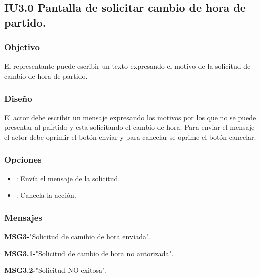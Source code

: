 \subsection{IU3.0 Pantalla de solicitar cambio de hora de partido.}

\subsubsection{Objetivo}
	El representante puede escribir un texto expresando el motivo de la solicitud de cambio de hora de partido.

\subsubsection{Diseño}
  El actor debe escribir un mensaje expresando los motivos por los que no se puede presentar al pafrtido y esta solicitando el cambio de hora.
  Para enviar el mensaje el actor debe oprimir el botón enviar y para cancelar se oprime el botón cancelar.


\subsubsection{Opciones}
\begin{itemize}
	\item {}: Envía el mensaje de la solicitud.
  \item {}: Cancela la acción.
\end{itemize}

\subsubsection{Mensajes}
	\begin{Citemize}
		\item {\bf MSG3-}"Solicitud de camibio de hora enviada".
		\item {\bf MSG3.1-}"Solicitud de cambio de hora no autorizada".
		\item {\bf MSG3.2-}"Solicitud NO exitosa".
	\end{Citemize}
